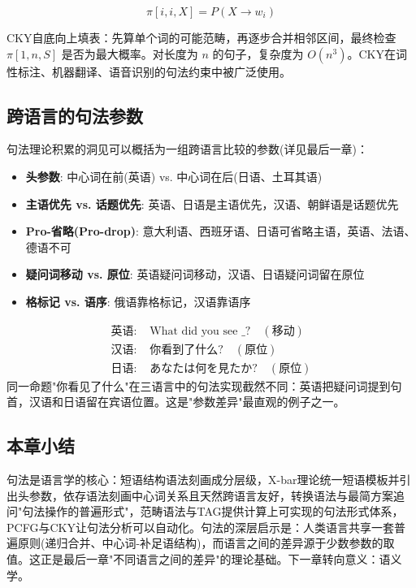 \begin{equation}
    \pi[i,i,X] = P(X \rightarrow w_i)
\end{equation}

CKY自底向上填表：先算单个词的可能范畴，再逐步合并相邻区间，最终检查 $\pi[1,n,S]$ 是否为最大概率。对长度为 $n$ 的句子，复杂度为 $O(n^3)$。CKY在词性标注、机器翻译、语音识别的句法约束中被广泛使用。

\subsection{跨语言的句法参数}

句法理论积累的洞见可以概括为一组跨语言比较的参数(详见最后一章)：
\begin{itemize}
    \item \textbf{头参数}: 中心词在前(英语) vs. 中心词在后(日语、土耳其语)
    \item \textbf{主语优先 vs. 话题优先}: 英语、日语是主语优先，汉语、朝鲜语是话题优先
    \item \textbf{Pro-省略(Pro-drop)}: 意大利语、西班牙语、日语可省略主语，英语、法语、德语不可
    \item \textbf{疑问词移动 vs. 原位}: 英语疑问词移动，汉语、日语疑问词留在原位
    \item \textbf{格标记 vs. 语序}: 俄语靠格标记，汉语靠语序
\end{itemize}

\begin{example}[疑问词原位 vs 移动]
\begin{align}
    \text{英语: } & \text{What did you see \_ ?} \quad (\text{移动}) \\
    \text{汉语: } & \text{你看到了什么?} \quad (\text{原位}) \\
    \text{日语: } & \text{あなたは何を見たか?} \quad (\text{原位})
\end{align}
同一命题"你看见了什么"在三语言中的句法实现截然不同：英语把疑问词提到句首，汉语和日语留在宾语位置。这是"参数差异"最直观的例子之一。
\end{example}

\subsection{本章小结}

句法是语言学的核心：短语结构语法刻画成分层级，X-bar理论统一短语模板并引出头参数，依存语法刻画中心词关系且天然跨语言友好，转换语法与最简方案追问"句法操作的普遍形式"，范畴语法与TAG提供计算上可实现的句法形式体系，PCFG与CKY让句法分析可以自动化。句法的深层启示是：人类语言共享一套普遍原则(递归合并、中心词-补足语结构)，而语言之间的差异源于少数参数的取值。这正是最后一章"不同语言之间的差异"的理论基础。下一章转向意义：语义学。

